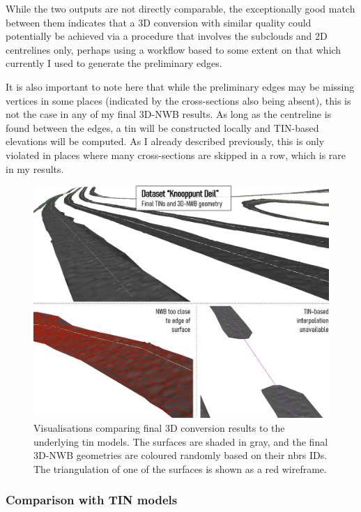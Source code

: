 While the two outputs are not directly comparable, the exceptionally good match between them indicates that a 3D conversion with similar quality could potentially be achieved via a procedure that involves the subclouds and 2D centrelines only, perhaps using a workflow based to some extent on that which currently I used to generate the preliminary edges.

It is also important to note here that while the preliminary edges may be missing vertices in some places (indicated by the cross-sections also being absent), this is not the case in any of my final 3D-NWB results. As long as the centreline is found between the edges, a \ac{tin} will be constructed locally and TIN-based elevations will be computed. As I already described previously, this is only violated in places where many cross-sections are skipped in a row, which is rare in my results.

\begin{figure}[h]
    \centering
    \includegraphics[width=0.9\linewidth]{final_report/figs/elevationinterpolation1.png}
    \caption[Renders comparing final 3D-NWB geometries with the underlying TIN models]{Visualisations comparing final 3D conversion results to the underlying \ac{tin} models. The surfaces are shaded in gray, and the final 3D-NWB geometries are coloured randomly based on their \ac{nbrs} IDs. The triangulation of one of the surfaces is shown as a red wireframe.}
    \label{fig:elevationinterpolation1}
\end{figure}

\subsubsection{Comparison with TIN models}

